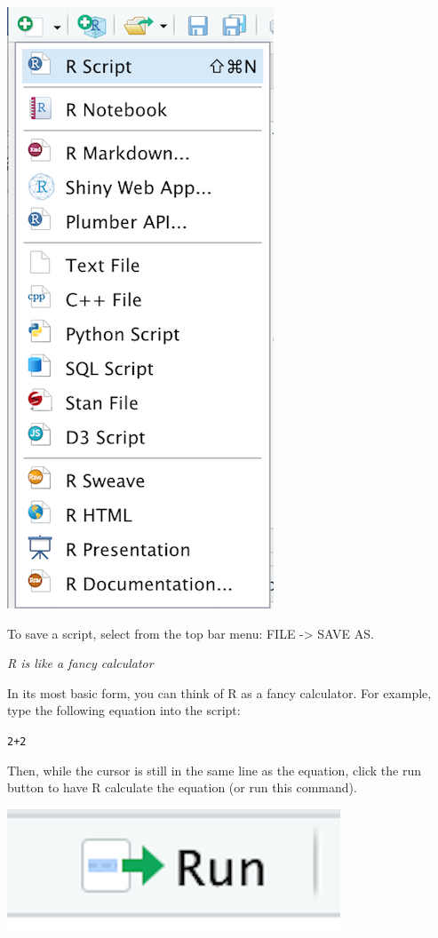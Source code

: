 \documentclass[
]{book}
\begin{document}
\includegraphics{img/NAVIGATING AND COMMANDS R17.png}

To save a script, select from the top bar menu: FILE -\textgreater{} SAVE AS.

\emph{R is like a fancy calculator}

In its most basic form, you can think of R as a fancy calculator. For example, type the following equation into the script:

\texttt{2+2}

Then, while the cursor is still in the same line as the equation, click the run button to have R calculate the equation (or run this command).

\includegraphics{img/NAVIGATING AND COMMANDS R18.png}
\end{document}
